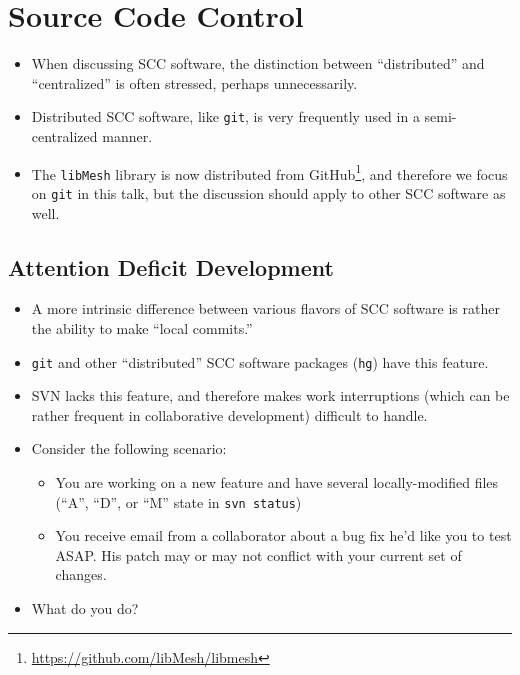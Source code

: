 \documentclass[mathserif]{beamer}
\newcommand{\libmesh}{\texttt{libMesh}\xspace}
\begin{document}
\section{Source Code Control}

\begin{frame}{}
  \begin{itemize}\itemsep=.05\textheight
  \item When discussing SCC software, the distinction between ``distributed'' and ``centralized''
    is often stressed, perhaps unnecessarily. 
  \item Distributed SCC software, like \texttt{git}, is very frequently used in a semi-centralized manner.
  \item The \libmesh library is now distributed from GitHub\footnote{\url{https://github.com/libMesh/libmesh}},
    and therefore we focus on \texttt{git} in this talk, but the discussion should apply to other
    SCC software as well.
  \end{itemize}
\end{frame}


\subsection{Attention Deficit Development}
\begin{frame}
  \begin{itemize}\itemsep=.05\textheight
  \item A more intrinsic difference between various flavors of SCC software is rather the ability to
    make ``local commits.''
  \item \texttt{git} and other ``distributed'' SCC software packages (\texttt{hg}) have this feature.
  \item SVN lacks this feature, and therefore makes work interruptions (which can be rather frequent in 
    collaborative development) difficult to handle.
  \end{itemize}
\end{frame}



\begin{frame}
  \begin{itemize}\itemsep=.05\textheight
  \item Consider the following scenario: 
    \begin{itemize}
    \item You are working on a new feature and have several locally-modified
      files (``A'', ``D'', or ``M'' state in \texttt{svn status})
    \item You receive email from a collaborator about a bug fix he'd like you to test ASAP.
      His patch may or may not conflict with your current set of changes.
    \end{itemize}
  \item What do you do?
  \end{itemize}
\end{frame}
\end{document}
